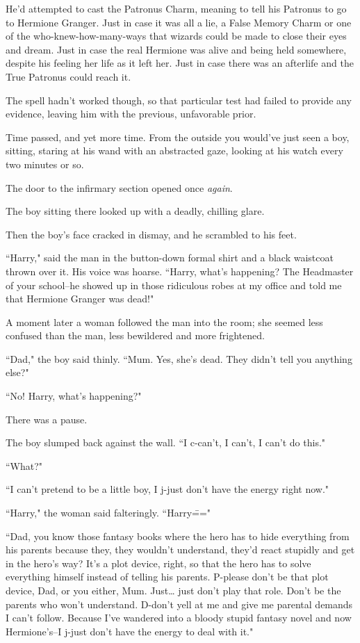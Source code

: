 He'd attempted to cast the Patronus Charm, meaning to tell his Patronus to go to Hermione Granger. Just in case it was all a lie, a False Memory Charm or one of the who-knew-how-many-ways that wizards could be made to close their eyes and dream. Just in case the real Hermione was alive and being held somewhere, despite his feeling her life as it left her. Just in case there was an afterlife and the True Patronus could reach it.

The spell hadn't worked though, so that particular test had failed to provide any evidence, leaving him with the previous, unfavorable prior.

Time passed, and yet more time. From the outside you would've just seen a boy, sitting, staring at his wand with an abstracted gaze, looking at his watch every two minutes or so.

The door to the infirmary section opened once \emph{again}.

The boy sitting there looked up with a deadly, chilling glare.

Then the boy's face cracked in dismay, and he scrambled to his feet.

``Harry," said the man in the button-down formal shirt and a black waistcoat thrown over it. His voice was hoarse. ``Harry, what's happening? The Headmaster of your school\---he showed up in those ridiculous robes at my office and told me that Hermione Granger was dead!"

A moment later a woman followed the man into the room; she seemed less confused than the man, less bewildered and more frightened.

``Dad," the boy said thinly. ``Mum. Yes, she's dead. They didn't tell you anything else?"

``No! Harry, what's happening?"

There was a pause.

The boy slumped back against the wall. ``I c-can't, I can't, I can't do this."

``What?"

``I can't pretend to be a little boy, I j-just don't have the energy right now."

``Harry," the woman said falteringly. ``Harry\==="

``Dad, you know those fantasy books where the hero has to hide everything from his parents because they, they wouldn't understand, they'd react stupidly and get in the hero's way? It's a plot device, right, so that the hero has to solve everything himself instead of telling his parents. P-please don't be that plot device, Dad, or you either, Mum. Just{\ldots} just don't play that role. Don't be the parents who won't understand. D-don't yell at me and give me parental demands I can't follow. Because I've wandered into a bloody stupid fantasy novel and now Hermione's\---I j-just don't have the energy to deal with it."

